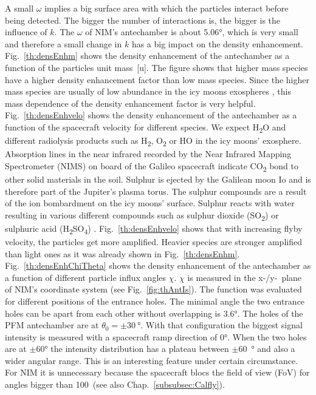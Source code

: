 	A small $\omega$ implies a big surface area with which the particles interact before being detected. The bigger the number of interactions is, the bigger is the influence of $k$. The $\omega$ of NIM's antechamber is about 5.06°, which is very small and therefore a small change in $k$ has a big impact on the density enhancement.\\
	Fig.~\ref{th:densEnhm} shows the density enhancement of the antechamber as a function of the particles unit mass~[u]. The figure shows that higher mass species have a higher density enhancement factor than low mass species. Since the higher mass species are usually of low abundance in the icy moons exospheres \cite{Vorburger2015,Vorburger_2018}, this mass dependence of the density enhancement factor is very helpful.\\
	Fig.~\ref{th:densEnhvelo} shows the density enhancement of the antechamber as a function of the spacecraft velocity for different species. We expect H\textsubscript{2}O and different radiolysis products such as H\textsubscript{2}, O\textsubscript{2} or HO in the icy moons' exosphere. Absorption lines in the near infrared recorded by the Near Infrared Mapping Spectrometer (NIMS) on board of the Galileo spacecraft indicate CO\textsubscript{2} bond to other solid materials in the soil. Sulphur is ejected by the Galilean moon Io and is therefore part of the Jupiter's plasma torus. The sulphur compounds are a result of the ion bombardment on the icy moons' surface. Sulphur reacts with water resulting in various different compounds such as sulphur dioxide (SO\textsubscript{2}) or sulphuric acid (H\textsubscript{2}SO\textsubscript{4}) \cite{Collins_2014}. Fig.~\ref{th:densEnhvelo} shows that with increasing flyby velocity, the particles get more amplified. Heavier species are stronger amplified than light ones as it was already shown in Fig.~\ref{th:densEnhm}.\\
	Fig.~\ref{th:densEnhChiTheta} shows the density enhancement of the antechamber as a function of different particle influx angles $\chi$. $\chi$ is measured in the x-/y-~plane of NIM's coordinate system (see Fig.~\ref{fig:thAntIs}). The function was evaluated for different positions of the entrance holes. The minimal angle the two entrance holes can be apart from each other without overlapping is 3.6\si{\degree}. The holes of the PFM antechamber are at $\theta_0 = \pm30~\si{\degree}$. With that configuration the biggest signal intensity is measured with a spacecraft ramp direction of 0\si{\degree}. When the two holes are at $\pm$60\si{\degree} the intensity distribution has a plateau between $\pm$60~\si{\degree} and also a wider angular range. 
	\pagebreak
	This is an interesting feature under certain circumstance. For NIM it is unnecessary because the spacecraft blocs the field of view (FoV) for angles bigger than 100\degree~(see also Chap.~\ref{subsubsec:Calfly}).
	

